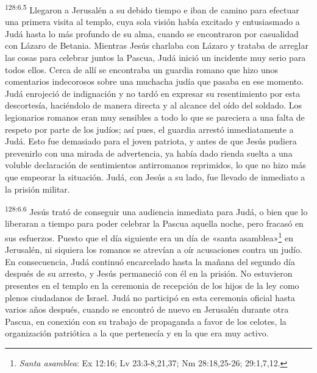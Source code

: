 \par 
\textsuperscript{128:6.5} Llegaron a Jerusalén a su debido tiempo e iban de camino para efectuar una primera visita al templo, cuya sola visión había excitado y entusiasmado a Judá hasta lo más profundo de su alma, cuando se encontraron por casualidad con Lázaro de Betania. Mientras Jesús charlaba con Lázaro y trataba de arreglar las cosas para celebrar juntos la Pascua, Judá inició un incidente muy serio para todos ellos. Cerca de allí se encontraba un guardia romano que hizo unos comentarios indecorosos sobre una muchacha judía que pasaba en ese momento. Judá enrojeció de indignación y no tardó en expresar su resentimiento por esta descortesía, haciéndolo de manera directa y al alcance del oído del soldado. Los legionarios romanos eran muy sensibles a todo lo que se pareciera a una falta de respeto por parte de los judíos; así pues, el guardia arrestó inmediatamente a Judá. Esto fue demasiado para el joven patriota, y antes de que Jesús pudiera prevenirlo con una mirada de advertencia, ya había dado rienda suelta a una voluble declaración de sentimientos antirromanos reprimidos, lo que no hizo más que empeorar la situación. Judá, con Jesús a su lado, fue llevado de inmediato a la prisión militar.

\par 
\textsuperscript{128:6.6} Jesús trató de conseguir una audiencia inmediata para Judá, o bien que lo liberaran a tiempo para poder celebrar la Pascua aquella noche, pero fracasó en sus esfuerzos. Puesto que el día siguiente era un día de «santa asamblea»\footnote{\textit{Santa asamblea}: Ex 12:16; Lv 23:3-8,21,37; Nm 28:18,25-26; 29:1,7,12.} en Jerusalén, ni siquiera los romanos se atrevían a oír acusaciones contra un judío. En consecuencia, Judá continuó encarcelado hasta la mañana del segundo día después de su arresto, y Jesús permaneció con él en la prisión. No estuvieron presentes en el templo en la ceremonia de recepción de los hijos de la ley como plenos ciudadanos de Israel. Judá no participó en esta ceremonia oficial hasta varios años después, cuando se encontró de nuevo en Jerusalén durante otra Pascua, en conexión con su trabajo de propaganda a favor de los celotes, la organización patriótica a la que pertenecía y en la que era muy activo.

